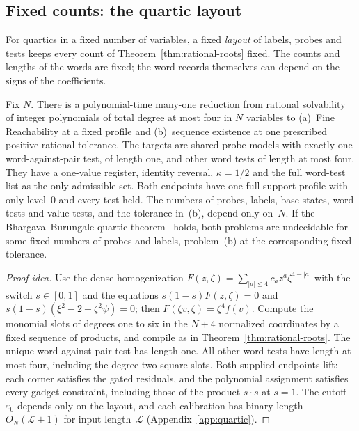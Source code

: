 \subsection{Fixed counts: the quartic layout}\label{sec:quartic}

For quartics in a fixed number of variables, a fixed \emph{layout} of labels, probes and tests keeps every
count of Theorem~\ref{thm:rational-roots} fixed. The counts and lengths of
the words are fixed; the word records themselves can depend on the signs
of the coefficients.

\begin{corollary}\label{cor:quartic}
Fix $N$. There is a polynomial-time many-one reduction from rational
solvability of integer polynomials of total degree at most four
in $N$ variables to (a)~Fine Reachability at a fixed profile and
(b)~sequence existence at one prescribed positive rational tolerance. The
targets are shared-probe models with exactly one word-against-pair test, of
length one, and other word tests of length at most four. They have a
one-value register, identity reversal, $\kappa=1/2$ and the full word-test
list as the only admissible set. Both endpoints have one full-support profile with
only level~$0$ and every test held. The numbers of probes, labels, base
states, word tests and value tests, and the tolerance in~(b), depend only
on~$N$. If
the Bhargava--Burungale quartic theorem~\cite[Corollary~1.2(3)]{bhargavaburungale} holds, both problems are undecidable for
some fixed numbers of probes and labels, problem~(b) at the corresponding
fixed tolerance.
\end{corollary}

\begin{proof}[Proof idea]
Use the dense homogenization
$F(z,\zeta)=\sum_{|a|\le4}c_az^a\zeta^{4-|a|}$ with the switch
$s\in[0,1]$ and the equations $s(1-s)F(z,\zeta)=0$ and
$s(1-s)(\xi^2-2-\zeta^2\psi)=0$; then $F(\zeta v,\zeta)=\zeta^4f(v)$.
Compute the monomial slots of degrees one to six in the $N+4$ normalized
coordinates by a fixed sequence of products, and compile as in
Theorem~\ref{thm:rational-roots}. The unique
word-against-pair test has length one. All other word tests have length at
most four, including the degree-two square slots. Both supplied endpoints
lift: each corner satisfies the gated residuals, and the polynomial
assignment satisfies every gadget constraint, including those of the
product $s\cdot s$ at $s=1$. The cutoff $\varepsilon_0$ depends only on the layout, and each
calibration has binary length $O_N(\mathcal L+1)$ for input length~$\mathcal L$
(Appendix~\ref{app:quartic}).
\end{proof}

